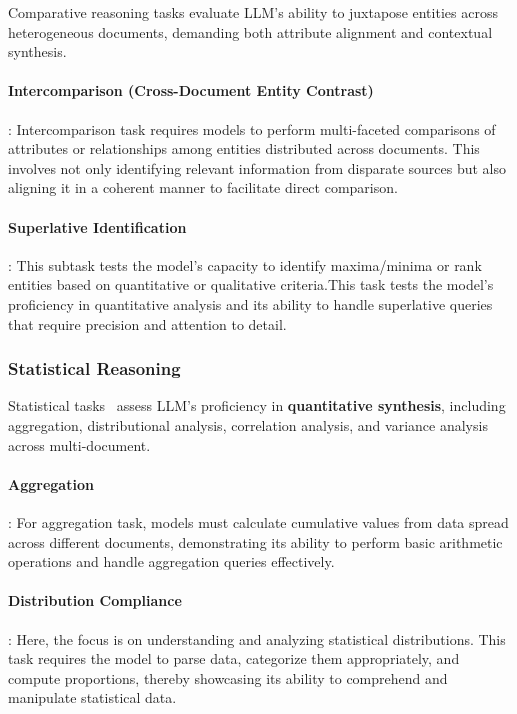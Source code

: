 Comparative reasoning tasks evaluate LLM’s ability to juxtapose entities across heterogeneous documents, demanding both attribute alignment and contextual synthesis.

\paragraph{Intercomparison (Cross-Document Entity Contrast)}: Intercomparison task requires models to perform multi-faceted comparisons of attributes or relationships among entities distributed across documents. This involves not only identifying relevant information from disparate sources but also aligning it in a coherent manner to facilitate direct comparison.

\paragraph{Superlative Identification}: This subtask tests the model’s capacity to identify maxima/minima or rank entities based on quantitative or qualitative criteria.This task tests the model's proficiency in quantitative analysis and its ability to handle superlative queries that require precision and attention to detail.

\subsubsection{Statistical Reasoning} 

Statistical tasks~\citep{zhu2024largel} assess LLM’s proficiency in \textbf{quantitative synthesis}, including aggregation, distributional analysis, correlation analysis, and variance analysis across multi-document.

\paragraph{Aggregation}: For aggregation task, models must calculate cumulative values from data spread across different documents, demonstrating its ability to perform basic arithmetic operations and handle aggregation queries effectively.  

\paragraph{Distribution Compliance}: Here, the focus is on understanding and analyzing statistical distributions. This task requires the model to parse data, categorize them appropriately, and compute proportions, thereby showcasing its ability to comprehend and manipulate statistical data.

